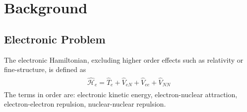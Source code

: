 \documentclass[final,3p,times,twocolumn]{elsarticle}
\newcommand{\ssth}{\textsuperscript{th}}
\newcommand{\ham}{\hat{\mathcal{H}}}
\begin{document}
\section{Background}
\subsection{Electronic Problem} \label{sec:elproblem}
The electronic Hamiltonian, excluding higher order effects such as relativity or fine-structure, is defined as
\begin{gather}
\begin{gathered}\label{eq:hame}
\ham_e = \hat T_e + \hat V_{eN} + \hat V_{ee} + \hat V_{NN}
\end{gathered}
\end{gather}
The terms in order are: electronic kinetic energy, electron-nuclear attraction, electron-electron repulsion, nuclear-nuclear repulsion. %
\end{document}
